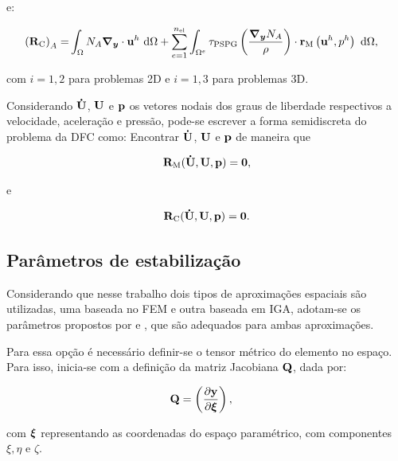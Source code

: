 \documentclass[tese_patricia]{subfiles}%
\begin{document}
\noindent e:

\begin{align}
	\begin{split}
	\left(\mathbf{R}_\mathrm{C}\right)_{A} = &\int_{\Omega} N_{A} \boldsymbol{\nabla_y} \cdot \mathbf{u}^h \ \mathrm{d} \Omega  
	+ \sum_{e=1}^{n_{\mathrm{el}}} \int_{\Omega^e} \tau_{\mathrm{PSPG}} \left(\frac{\boldsymbol{\nabla_y} N_{A}}{\rho}\right) \cdot \mathbf{r}_{\mathrm{M}}\left(\mathbf{u}^h,p^h\right) \  \mathrm{d} \Omega,
	\end{split}
\end{align}

\noindent com $i=1,2$ para problemas 2D e $i=1,3$ para problemas 3D.
		
Considerando $\mathbf{\dot{U}}$, $\mathbf{U}$ e $\mathbf{p}$ os vetores nodais dos graus de liberdade respectivos a velocidade, aceleração e pressão, pode-se escrever a forma semidiscreta do problema da DFC como: Encontrar $\mathbf{\dot{U}}$, $\mathbf{U}$ e $\mathbf{p}$ de maneira que

\begin{align}
\mathbf{R}_\mathrm{M}(\mathbf{\dot{U}},\mathbf{U},\mathbf{p}) = \mathbf{0},\label{eq:resid_semi_discr_QM}
\end{align}

\noindent e

\begin{align}
\mathbf{R}_\mathrm{C}(\mathbf{\dot{U}},\mathbf{U},\mathbf{p}) = \mathbf{0}. \label{eq:resid_semi_discr_C}
\end{align}



\subsection{Parâmetros de estabilização}\label{capitulo:Cap2:FormaFraca:taus}

Considerando que nesse trabalho dois tipos de aproximações espaciais são utilizadas, uma baseada no FEM e outra baseada em IGA, adotam-se os parâmetros propostos por  e , que são adequados para ambas aproximações. 

Para essa opção é necessário definir-se o tensor métrico do elemento no espaço. Para isso, inicia-se com a definição da matriz Jacobiana $\mathbf{Q}$, dada por:

\begin{align}
	\mathbf{Q}&=\left(\frac{\partial\mathbf{y}}{\partial\bm{\xi}}\right),
\end{align}

\noindent com $\bm{\xi}$ representando as coordenadas do espaço paramétrico, com componentes $\xi, \eta$ e $\zeta$.
\end{document}
